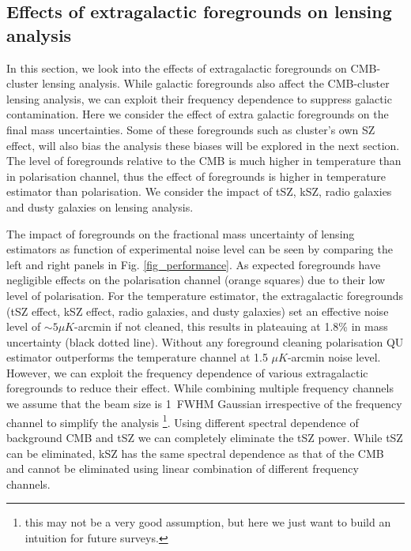    \subsection{Effects of extragalactic foregrounds on lensing analysis}
   In this section, we look into the effects of extragalactic foregrounds on CMB-cluster lensing analysis. While galactic foregrounds also affect the CMB-cluster lensing analysis, we can exploit their frequency dependence to suppress galactic contamination. Here we consider the effect of extra galactic foregrounds on the final mass uncertainties. Some of these foregrounds such as cluster's own SZ effect, will also bias the analysis these biases will be explored in the next section. The level of foregrounds relative to the CMB is much higher in temperature than in polarisation channel, thus the effect of foregrounds is higher in temperature estimator than polarisation. We consider the impact of tSZ, kSZ, radio galaxies and dusty galaxies on lensing analysis.
   
   The impact of foregrounds on the fractional mass uncertainty of lensing estimators as function of experimental noise level can be seen by comparing the left and right panels in Fig. \ref{fig_performance}. 
   As expected foregrounds have negligible effects on the polarisation channel (orange squares) due to their low level of polarisation.
   For the temperature estimator, the extragalactic foregrounds (tSZ effect, kSZ effect, radio galaxies, and dusty galaxies) set an effective noise level of $\sim5\mu K$-arcmin if not cleaned, this results in plateauing at 1.8\% in mass uncertainty (black dotted line). 
   Without any foreground cleaning polarisation QU estimator outperforms the temperature channel at 1.5 $\mu K$-arcmin noise level.
 However, we can exploit the frequency dependence of various extragalactic foregrounds to reduce their effect.
 While combining multiple frequency channels we assume that the beam size is 1\am\ FWHM Gaussian irrespective of the frequency channel to simplify the analysis \footnote{ this may not be a very good assumption, but here we just want to build an intuition for future surveys.}. 
Using different spectral dependence of background CMB and tSZ we can completely eliminate the tSZ power.
While tSZ can be eliminated, kSZ has the same spectral dependence as that of the CMB and cannot be eliminated using linear combination of different frequency channels.
 
